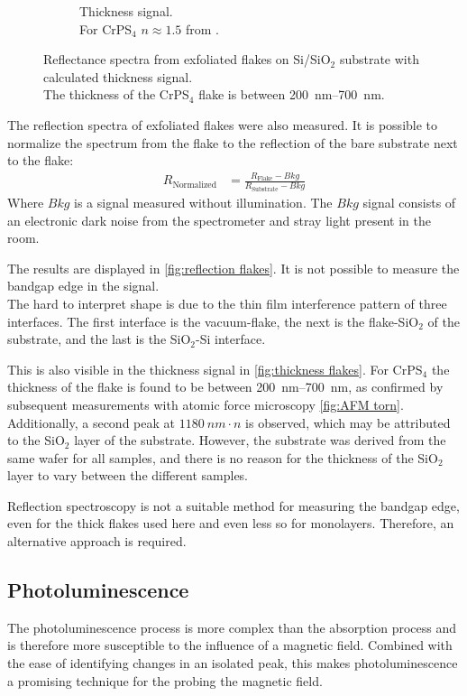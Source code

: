 \documentclass[
	oneside,
	parskip=half,
	a4paper,
]{scrbook}
\begin{document}
\begin{figure}
\begin{subfigure}[c]{2in}
		\caption{Thickness signal.\\ For CrPS$_4$  $n\approx1.5$ from \cite{CrPS4_refrative}. }
		\label{fig:thickness flakes}
	\end{subfigure}
	\caption{Reflectance spectra from exfoliated flakes on Si/SiO$_2$ substrate with calculated thickness signal.\\ The thickness of the CrPS$_4$ flake is between \SIrange{200}{700}{nm}.}
\end{figure}
The reflection spectra of exfoliated flakes were also measured.
It is possible to normalize the spectrum from the flake to the reflection of the bare substrate next to the flake:
\begin{align}
	R_\text{Normalized} &= \frac{R_\text{Flake} - Bkg}{R_\text{Substrate} - Bkg}
\end{align}
Where $Bkg$ is a signal measured without illumination. 
The $Bkg$ signal consists of an electronic dark noise from the spectrometer and stray light present in the room.

The results are displayed in \autoref{fig:reflection flakes}.
It is not possible to measure the bandgap edge in the signal.\\
The hard to interpret shape is due to the thin film interference pattern of three interfaces.
The first interface is the vacuum-flake, the next is the flake-SiO$_2$ of the substrate, and the last is the SiO$_2$-Si interface.

This is also visible in the thickness signal in \autoref{fig:thickness flakes}.
For CrPS$_4$ the thickness of the flake is found to be between \SIrange{200}{700}{nm}, as confirmed by subsequent measurements with atomic force microscopy \autoref{fig:AFM torn}.\\
Additionally, a second peak at $\SI{1180}{nm}\cdot n$ is observed, which may be attributed to the SiO$_2$ layer of the substrate. 
However, the substrate was derived from the same wafer for all samples, and there is no reason for the thickness of the SiO$_2$ layer to vary between the different samples.

Reflection spectroscopy is not a suitable method for measuring the bandgap edge, even for the thick flakes used here and even less so for monolayers. 
Therefore, an alternative approach is required.

\subsection{Photoluminescence}
The photoluminescence process is more complex than the absorption process and is therefore more susceptible to the influence of a magnetic field. 
Combined with the ease of identifying changes in an isolated peak, this makes photoluminescence a promising technique for the probing the magnetic field.
\end{document}
